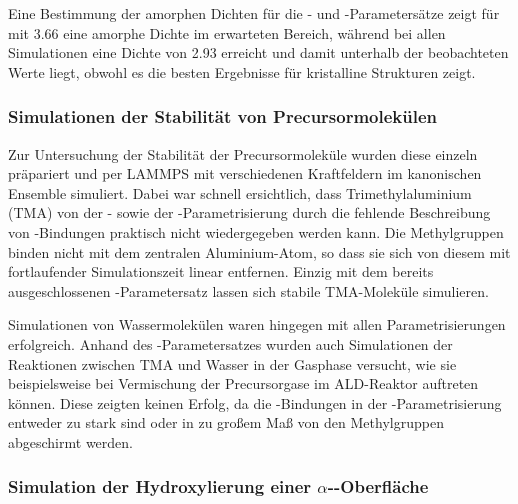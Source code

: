 Eine Bestimmung der amorphen Dichten für die - und -Parametersätze zeigt für  mit \SI{3.66}{\gpcc} eine amorphe Dichte im erwarteten Bereich, während  bei allen Simulationen eine Dichte von \SI{2.93}{\gpcc} erreicht und damit unterhalb der beobachteten Werte liegt, obwohl es die besten Ergebnisse für kristalline Strukturen zeigt.

\subsubsection{Simulationen der Stabilität von Precursormolekülen}

Zur Untersuchung der Stabilität der Precursormoleküle wurden diese einzeln präpariert und per LAMMPS mit verschiedenen Kraftfeldern im kanonischen Ensemble simuliert.
Dabei war schnell ersichtlich, dass Trimethylaluminium (TMA) von der - sowie der -Para\-metr\-isierung durch die fehlende Beschreibung von -Bindungen praktisch nicht wiedergegeben werden kann.
Die Methylgruppen binden nicht mit dem zentralen Aluminium-Atom, so dass sie sich von diesem mit fortlaufender Simulationszeit linear entfernen.
Einzig mit dem bereits ausgeschlossenen -Parametersatz lassen sich stabile TMA-Moleküle simulieren.

Simulationen von Wassermolekülen waren hingegen mit allen Parametrisierungen erfolgreich.
Anhand des -Parametersatzes wurden auch Simulationen der Reaktionen zwischen TMA und Wasser in der Gasphase versucht, wie sie beispielsweise bei Vermischung der Precursorgase im ALD-Reaktor auftreten können.
Diese zeigten keinen Erfolg, da die -Bindungen in der -Parametrisierung entweder zu stark sind oder in zu großem Maß von den Methylgruppen abgeschirmt werden.

\subsubsection{Simulation der Hydroxylierung einer $\alpha$--Oberfläche}

